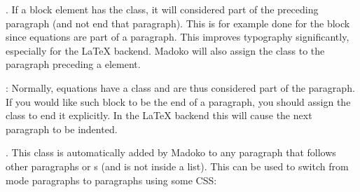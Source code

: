 \documentclass{book}
\begin{document}
\begin{mdUl}[class={list-star,compact},data-line={3423}]%
\begin{mdLi}[data-line={3423}]%
{}%
{}. If a block element has the %
{}%
{} class, it will
  considered part of the preceding paragraph (and not end that paragraph).
  This is for example done for the %
{}%
{} block since equations are part
  of a paragraph. This improves typography significantly, especially for
  the LaTeX backend. Madoko will also assign the %
{}%
{} class to the
  paragraph preceding a %
{}%
{} element.%
\end{mdLi}%
\begin{mdLi}[data-line={3429}]%
{}%
{}: Normally, equations have a %
{}%
{} class and are thus 
  considered part of the paragraph. If you would like such block to be the
  end of a paragraph, you should assign the %
{}%
{} class to end it explicitly.
  In the LaTeX backend this will cause the next paragraph to be indented.  %
{} %
{}%
\end{mdLi}%
\begin{mdLi}[data-line={3433}]%
{}%
{}. This class is automatically added by Madoko to any paragraph that
  follows other paragraphs or %
{}%
{}s (and is not inside a list). 
  This can be used to switch
  from %
{}%
{} mode paragraphs to %
{}%
{} paragraphs using some CSS:
\begin{mdPre}[class={para-block,pre-indented,language-madoko,lang-madoko,madoko,highlighted},language={madoko},data-line={3437}]%
%

\end{mdPre}
\end{mdLi}
\end{mdUl}
\end{document}
